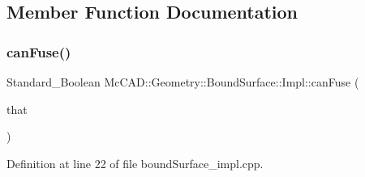 \subsection{Member Function Documentation}
\mbox{\label{classMcCAD_1_1Geometry_1_1BoundSurface_1_1Impl_af5148dae00248364c869ac60e144afba}} 
\subsubsection{\texorpdfstring{can\+Fuse()}{canFuse()}\hspace{0.1cm}{\footnotesize\ttfamily [1/2]}}
{\footnotesize\ttfamily Standard\+\_\+\+Boolean Mc\+C\+A\+D\+::\+Geometry\+::\+Bound\+Surface\+::\+Impl\+::can\+Fuse (\begin{DoxyParamCaption}\item[{const \hyperlink{classMcCAD_1_1Geometry_1_1BoundSurface}{Bound\+Surface} \&}]{that }\end{DoxyParamCaption})}



Definition at line 22 of file bound\+Surface\+\_\+impl.\+cpp.


